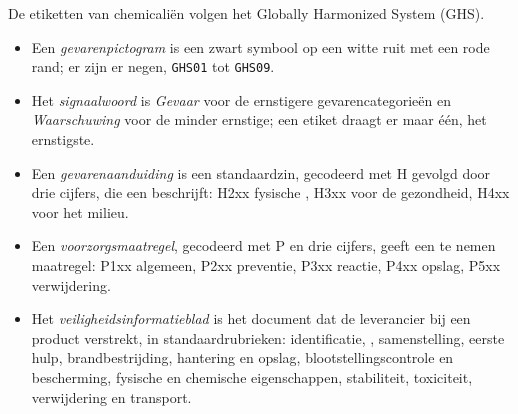 \begin{definition}\label{def:b1:lab-techniques-1:ghs}
De etiketten van chemicaliën volgen het Globally Harmonized System (GHS).
\begin{itemize}
  \item Een \emph{gevarenpictogram} is een zwart
        symbool op een witte ruit met een rode rand; er zijn er negen,
        \texttt{GHS01} tot \texttt{GHS09}.
  \item Het \emph{signaalwoord} is \emph{Gevaar} voor
        de ernstigere gevarencategorieën en \emph{Waarschuwing} voor de
        minder ernstige; een etiket draagt er maar één, het ernstigste.
  \item Een \emph{gevarenaanduiding} is een
        standaardzin, gecodeerd met H gevolgd door drie cijfers, die een
         beschrijft: H2xx fysische , H3xx  voor de
        gezondheid, H4xx  voor het milieu.
  \item Een \emph{voorzorgsmaatregel},
        gecodeerd met P en drie cijfers, geeft een te nemen maatregel:
        P1xx algemeen, P2xx preventie, P3xx reactie, P4xx opslag, P5xx
        verwijdering.
  \item Het \emph{veiligheidsinformatieblad}
        is het document dat de leverancier bij een product verstrekt, in
        standaardrubrieken: identificatie, , samenstelling, eerste
        hulp, brandbestrijding, hantering en opslag, blootstellingscontrole
        en bescherming, fysische en chemische eigenschappen, stabiliteit,
        toxiciteit, verwijdering en transport.
\end{itemize}
\end{definition}


